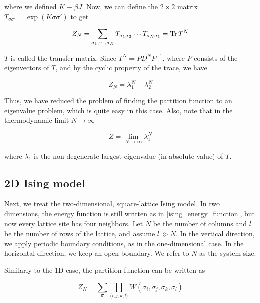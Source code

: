 where we defined $K \equiv \beta J$. Now, we can define
the $2 \times 2$ matrix $T_{\sigma \sigma'} = \exp(K \sigma \sigma')$ to get

\begin{equation}
  Z_N = \sum_{\sigma_1, \cdots, \sigma_N} T_{\sigma_1 \sigma_2} \dotsm T_{\sigma_N \sigma_1} = \operatorname{Tr} T^N
\end{equation}

$T$ is called the transfer matrix. Since $T^N = P D^N P^{-1}$, where $P$
consists of the eigenvectors of $T$, and by the cyclic property of the trace, we
have

\begin{equation}
  Z_N = \lambda_{1}^{N} + \lambda_{2}^{N}
\end{equation}

Thus, we have reduced the problem of finding the partition function to an
eigenvalue problem, which is quite easy in this case. Also, note that in the thermodynamic limit $N \to \infty$

\begin{equation}
  Z = \lim_{N \to \infty} \lambda_{1}^{N}
\end{equation}

where $\lambda_1$ is the non-degenerate largest eigenvalue (in absolute value) of $T$.

\subsection{2D Ising model}

Next, we treat the two-dimensional, square-lattice Ising model. In two
dimensions, the energy function is still written as in
\eqref{ising_energy_function}, but now every lattice site has four neighbors.
Let $N$ be the number of columns and $l$ be the number of rows of the lattice, and assume 
$l \gg N$. In the vertical direction, we apply periodic boundary conditions, as in the one-dimensional case.
In the horizontal direction, we keep an open boundary. We refer to $N$ as the system size.

Similarly to the 1D case, the partition function can be written as 

\begin{equation}
  Z_N = \sum_{\bm{\sigma}} \prod_{\langle i, j, k, l \rangle} W(\sigma_i, \sigma_j, \sigma_k, \sigma_l)
\end{equation}

